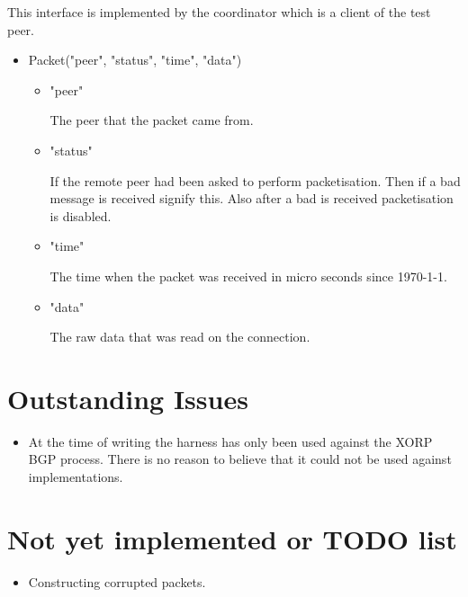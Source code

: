\documentclass[11pt]{article}
\begin{document}
This interface is implemented by the coordinator which is a client of
the test peer.

\begin{itemize}
\item Packet("peer", "status", "time", "data")

  \begin{itemize}
        \item "peer"
          
          The peer that the packet came from.

        \item "status" 
          
          If the remote peer had been asked to perform packetisation.
          Then if a bad message is received signify this. Also after a
          bad is received packetisation is disabled.

        \item "time"
          
          The time when the packet was received in micro seconds since
          \mbox{1970-1-1}.

        \item "data"
          
          The raw data that was read on the connection.

      \end{itemize}
\end{itemize}

\section{Outstanding Issues}

\begin{itemize}
\item At the time of writing the harness has only been used against
  the XORP BGP process. There is no reason to believe that it could
  not be used against implementations.
\end{itemize}

\section{\label{NYI} Not yet implemented or TODO list}

\begin{itemize}
\item Constructing corrupted packets.
\end{itemize}



\end{document}

